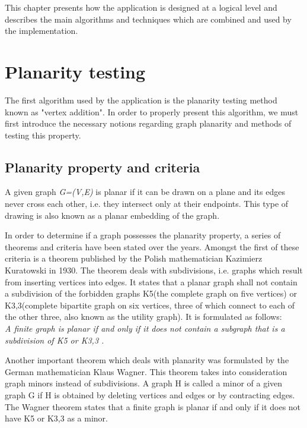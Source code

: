 \label{Algorithm Design}
This chapter presents how the application is designed at a logical level and describes the 
main algorithms and techniques which are combined and used by the implementation.

\section{Planarity testing}

The first algorithm used by the application is the planarity testing method known as "vertex addition". In 
order to properly present this algorithm, we must first introduce the necessary notions regarding graph planarity 
and methods of testing this property.

\subsection{Planarity property and criteria}

A given graph \emph{G=(V,E)} is planar if it can be drawn on a plane and its edges never cross each other, i.e. they 
intersect only at their endpoints. This type of drawing is also known as a planar embedding of the graph.

In order to determine if a graph possesses the planarity property, a series of theorems and criteria have been 
stated over the years. Amongst the first of these criteria is a theorem published by the Polish mathematician 
Kazimierz Kuratowski\cite{kuratowski} in 1930. The theorem deals with subdivisions, i.e. graphs which result from inserting vertices 
into edges. It states that a planar graph shall not contain a subdivision of the forbidden graphs K5(the complete 
graph on five vertices) or K3,3(complete bipartite graph on six vertices, three of which connect to each of the other 
three, also known as the utility graph). It is formulated as follows:\\

\textit{
A finite graph is planar if and only if it does not contain a subgraph that is a subdivision of K5 or K3,3 .
}

Another important theorem which deals with planarity was formulated by the German mathematician Klaus Wagner. 
This theorem takes into consideration graph minors instead of subdivisions. A graph H is called a minor of a given 
graph G if H is obtained by deleting vertices and edges or by contracting edges. The Wagner theorem states that 
a finite graph is planar if and only if it does not have K5 or K3,3 as a minor.

